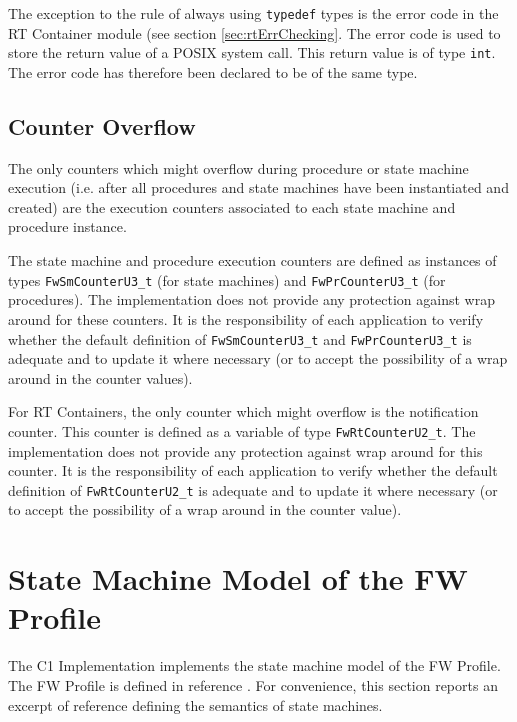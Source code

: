 \documentclass[a4paper,10pt]{article}
\let\stdsection\section
\renewcommand\section{\newpage\stdsection}
\begin{document}
The exception to the rule of always using \texttt{typedef} types is the error code in the RT Container module (see section \ref{sec:rtErrChecking}. The error code is used to store the return value of a POSIX system call. This return value is of type \texttt{int}. The error code has therefore been declared to be of the same type.

\subsection{Counter Overflow}
The only counters which might overflow during procedure or state machine execution (i.e. after all 
procedures and state machines have been instantiated and created) are the execution counters
associated to each state machine and procedure instance.

The state machine and procedure execution counters are defined as instances of types 
\texttt{FwSmCounterU3\_t} (for state machines) and \texttt{FwPrCounterU3\_t} (for procedures).
The implementation does not provide any protection against wrap around for these counters. It is the responsibility
of each application to verify whether the default definition of \texttt{FwSmCounterU3\_t} and \texttt{FwPrCounterU3\_t}
is adequate and to update it where necessary (or to accept the possibility of a wrap around in the counter values).

For RT Containers, the only counter which might overflow is the notification counter. This counter is defined as a variable of type \texttt{FwRtCounterU2\_t}. The implementation does not provide any protection against wrap around for this counter. It is the responsibility of each application to verify whether the default definition of \texttt{FwRtCounterU2\_t} is adequate and to update it where necessary (or to accept the possibility of a wrap around in the counter value).

\appendix
\section{State Machine Model of the FW Profile}\label{sec:smModel}
The C1 Implementation implements the state machine model of the FW Profile. The FW Profile is defined in reference \cite{ref:fwprofile}. For convenience, this section reports an excerpt of reference \cite{ref:fwprofile} defining the semantics of state machines.


\end{document}
